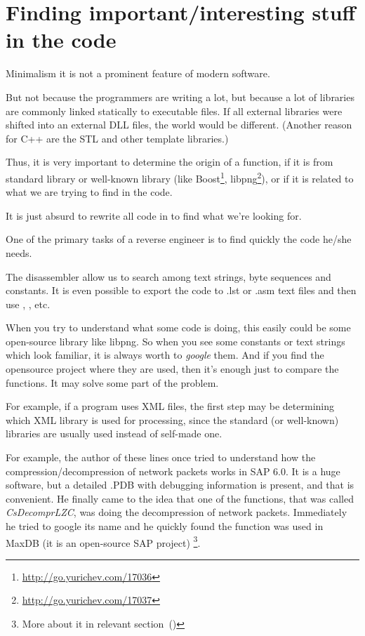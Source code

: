 \chapter{Finding important/interesting stuff in the code}

Minimalism it is not a prominent feature of modern software.


But not because the programmers are writing a lot, but because a lot of libraries are commonly linked statically
to executable files.
If all external libraries were shifted into an external DLL files, the world would be different.
(Another reason for C++ are the \ac{STL} and other template libraries.)

\newcommand{\FOOTNOTEBOOST}{\footnote{\url{http://go.yurichev.com/17036}}}
\newcommand{\FOOTNOTELIBPNG}{\footnote{\url{http://go.yurichev.com/17037}}}

Thus, it is very important to determine the origin of a function, if it is from standard library or 
well-known library (like Boost\FOOTNOTEBOOST, libpng\FOOTNOTELIBPNG),
or if it is related to what we are trying to find in the code.

It is just absurd to rewrite all code in \CCpp to find what we're looking for.

One of the primary tasks of a reverse engineer is to find quickly the code he/she needs.

\myindex{\GrepUsage}

The \IDA disassembler allow us to search among text strings, byte sequences and constants.
It is even possible to export the code to .lst or .asm text files and then use , , etc.

When you try to understand what some code is doing, this easily could be some open-source library like libpng.
So when you see some constants or text strings which look familiar, it is always worth to \emph{google} them.
And if you find the opensource project where they are used, 
then it's enough just to compare the functions.
It may solve some part of the problem.

For example, if a program uses XML files, the first step may be determining which
XML library is used for processing, since the standard (or well-known) libraries are usually used
instead of self-made one.


For example, the author of these lines once tried to understand how the compression/decompression of network packets works in SAP 6.0. 
It is a huge software, but a detailed .\gls{PDB} with debugging information is present, 
and that is convenient.
He finally came to the idea that one of the functions, that was called \emph{CsDecomprLZC}, was doing the decompression of network packets.
Immediately he tried to google its name and he quickly found the function was used in MaxDB
(it is an open-source SAP project) \footnote{More about it in relevant section~()}.

